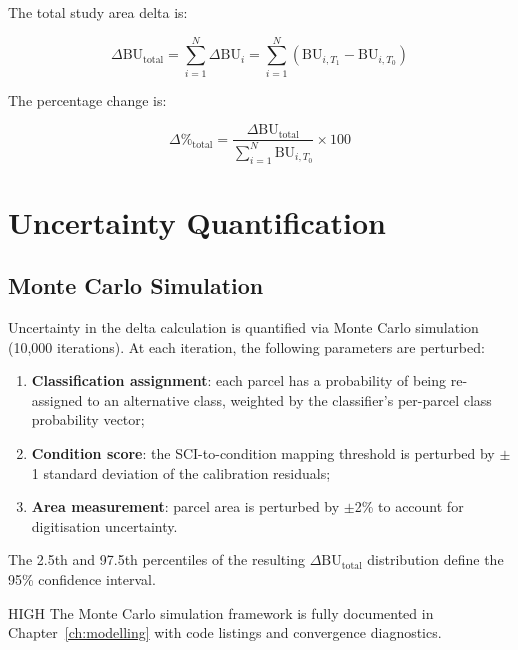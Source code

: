 The total study area delta is:

\begin{equation}
\Delta\text{BU}_{\text{total}} = \sum_{i=1}^{N} \Delta\text{BU}_i = \sum_{i=1}^{N} \left( \text{BU}_{i,T_1} - \text{BU}_{i,T_0} \right)
\label{eq:delta-total}
\end{equation}

The percentage change is:

\begin{equation}
\Delta\%_{\text{total}} = \frac{\Delta\text{BU}_{\text{total}}}{\sum_{i=1}^{N} \text{BU}_{i,T_0}} \times 100
\label{eq:delta-pct}
\end{equation}


\section{Uncertainty Quantification}

\subsection{Monte Carlo Simulation}

Uncertainty in the delta calculation is quantified via Monte Carlo simulation (10,000 iterations). At each iteration, the following parameters are perturbed:

\begin{enumerate}[nosep]
  \item \textbf{Classification assignment}: each parcel has a probability of being re-assigned to an alternative class, weighted by the classifier's per-parcel class probability vector;
  \item \textbf{Condition score}: the SCI-to-condition mapping threshold is perturbed by $\pm$1 standard deviation of the calibration residuals;
  \item \textbf{Area measurement}: parcel area is perturbed by $\pm$2\% to account for digitisation uncertainty.
\end{enumerate}

The 2.5th and 97.5th percentiles of the resulting $\Delta\text{BU}_{\text{total}}$ distribution define the 95\% confidence interval.

\begin{confidencebox}{HIGH}
The Monte Carlo simulation framework is fully documented in Chapter~\ref{ch:modelling} with code listings and convergence diagnostics.
\end{confidencebox}

